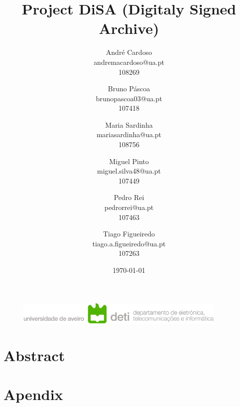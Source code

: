 \documentclass[a4paper,11pt]{article}
\title{Project DiSA (Digitaly Signed Archive)}
\author{
	André Cardoso\\
	andremacardoso@ua.pt\\
	108269\\
	\and
	Bruno Páscoa\\
	brunopascoa03@ua.pt\\
	107418\\
	\and
	Maria Sardinha\\
	mariasardinha@ua.pt\\
	108756\\
	\and
	Miguel Pinto\\
	miguel.silva48@ua.pt\\
	107449\\
	\and
	Pedro Rei\\
	pedrorrei@ua.pt\\
	107463\\
    \and	
    Tiago Figueiredo\\
    tiago.a.figueiredo@ua.pt\\
    107263\\
}
\date{\today}
\begin{document}
    \begin{figure}
        \centering

        \includegraphics[width=0.9\textwidth]{deti2}\label{fig:figure}
    \end{figure}
    \maketitle
    \tableofcontents
    \clearpage


    \section{Abstract}\label{sec:Abstract}


    \section{Apendix}\label{sec:apendix}
    
\end{document}
